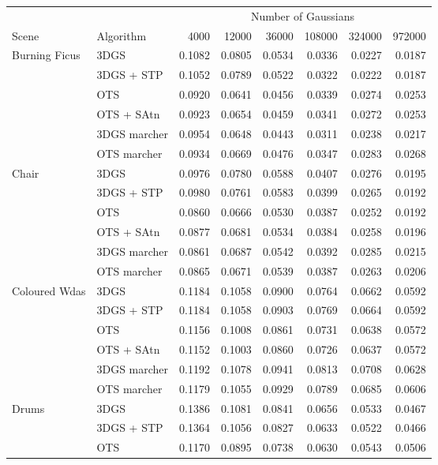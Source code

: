 \begin{longtable}[H]{llrrrrrr}
\toprule
& & \multicolumn{6}{c}{Number of Gaussians} \\
Scene & Algorithm & 4000 & 12000 & 36000 & 108000 & 324000 & 972000 \\
\midrule \endhead
Burning Ficus & 3DGS & 0.1082 & 0.0805 & 0.0534 & 0.0336 & 0.0227 & 0.0187 \\
 & 3DGS + STP & 0.1052 & 0.0789 & 0.0522 & 0.0322 & 0.0222 & 0.0187 \\
 & OTS & 0.0920 & 0.0641 & 0.0456 & 0.0339 & 0.0274 & 0.0253 \\
 & OTS + SAtn & 0.0923 & 0.0654 & 0.0459 & 0.0341 & 0.0272 & 0.0253 \\
 & 3DGS marcher & 0.0954 & 0.0648 & 0.0443 & 0.0311 & 0.0238 & 0.0217 \\
 & OTS marcher & 0.0934 & 0.0669 & 0.0476 & 0.0347 & 0.0283 & 0.0268 \\
Chair & 3DGS & 0.0976 & 0.0780 & 0.0588 & 0.0407 & 0.0276 & 0.0195 \\
 & 3DGS + STP & 0.0980 & 0.0761 & 0.0583 & 0.0399 & 0.0265 & 0.0192 \\
 & OTS & 0.0860 & 0.0666 & 0.0530 & 0.0387 & 0.0252 & 0.0192 \\
 & OTS + SAtn & 0.0877 & 0.0681 & 0.0534 & 0.0384 & 0.0258 & 0.0196 \\
 & 3DGS marcher & 0.0861 & 0.0687 & 0.0542 & 0.0392 & 0.0285 & 0.0215 \\
 & OTS marcher & 0.0865 & 0.0671 & 0.0539 & 0.0387 & 0.0263 & 0.0206 \\
Coloured Wdas & 3DGS & 0.1184 & 0.1058 & 0.0900 & 0.0764 & 0.0662 & 0.0592 \\
 & 3DGS + STP & 0.1184 & 0.1058 & 0.0903 & 0.0769 & 0.0664 & 0.0592 \\
 & OTS & 0.1156 & 0.1008 & 0.0861 & 0.0731 & 0.0638 & 0.0572 \\
 & OTS + SAtn & 0.1152 & 0.1003 & 0.0860 & 0.0726 & 0.0637 & 0.0572 \\
 & 3DGS marcher & 0.1192 & 0.1078 & 0.0941 & 0.0813 & 0.0708 & 0.0628 \\
 & OTS marcher & 0.1179 & 0.1055 & 0.0929 & 0.0789 & 0.0685 & 0.0606 \\
Drums & 3DGS & 0.1386 & 0.1081 & 0.0841 & 0.0656 & 0.0533 & 0.0467 \\
 & 3DGS + STP & 0.1364 & 0.1056 & 0.0827 & 0.0633 & 0.0522 & 0.0466 \\
 & OTS & 0.1170 & 0.0895 & 0.0738 & 0.0630 & 0.0543 & 0.0506 \\

\end{longtable}
